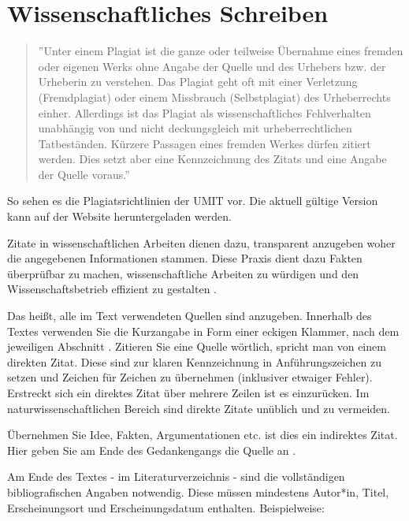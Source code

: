 \section*{Wissenschaftliches Schreiben}

\begin{quotation}
''Unter einem Plagiat ist die ganze oder teilweise Übernahme eines fremden oder eigenen Werks ohne Angabe der Quelle und des Urhebers bzw. der Urheberin zu verstehen. Das Plagiat geht oft mit einer Verletzung (Fremdplagiat) oder einem Missbrauch (Selbstplagiat) des Urheberrechts einher. Allerdings ist das Plagiat als wissenschaftliches Fehlverhalten unabhängig von und nicht deckungsgleich mit urheberrechtlichen Tatbeständen. Kürzere Passagen eines fremden Werkes dürfen zitiert werden. Dies setzt aber eine Kennzeichnung des Zitats und eine Angabe der Quelle voraus.'' \citep{Umit_plag}
\end{quotation}
So sehen es die Plagiatsrichtlinien der UMIT vor. Die aktuell gültige Version kann auf der Website heruntergeladen werden.
\newline

Zitate in wissenschaftlichen Arbeiten dienen dazu, transparent anzugeben woher die angegebenen Informationen stammen. Diese Praxis dient dazu Fakten überprüfbar zu machen, wissenschaftliche Arbeiten zu würdigen und den Wissenschaftsbetrieb effizient zu gestalten \citep{Heesen.2014}. %

Das heißt, alle im Text verwendeten Quellen sind anzugeben. Innerhalb des Textes verwenden Sie die Kurzangabe in Form einer eckigen Klammer, nach dem jeweiligen Abschnitt \citep{Rettig.2017}.
Zitieren Sie eine Quelle wörtlich, spricht man von einem direkten Zitat. Diese sind zur klaren Kennzeichnung in Anführungszeichen zu setzen und Zeichen für Zeichen zu übernehmen (inklusiver etwaiger Fehler). Erstreckt sich ein direktes Zitat über mehrere Zeilen ist es einzurücken. Im naturwissenschaftlichen Bereich sind direkte Zitate unüblich und zu vermeiden. 
  
Übernehmen Sie Idee, Fakten, Argumentationen etc. ist dies ein indirektes Zitat. Hier geben Sie am Ende des Gedankengangs die Quelle an \citep{Heesen.2014}.

Am Ende des Textes - im Literaturverzeichnis - sind die vollständigen bibliografischen Angaben notwendig. Diese müssen mindestens Autor*in, Titel, Erscheinungsort und Erscheinungsdatum enthalten. Beispielweise: 

